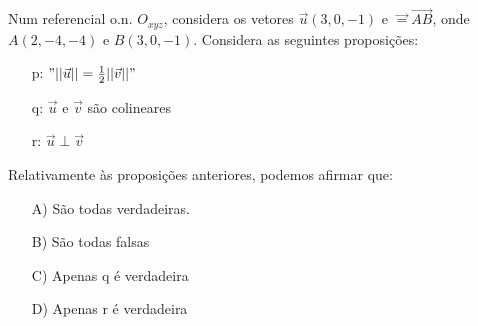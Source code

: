 Num referencial o.n. $O_{xyz}$, considera os vetores $\vec u (3,0,-1)$ e $\vec = \overrightarrow{AB}$, onde $A(2,-4,-4)$ e $B(3,0,-1)$.  Considera as seguintes proposições:
\begin{enumerate}
\item [p:] $"|| \vec u || = \frac 1 2 ||\vec v ||"$
\item [q:] $ \vec u$ e $\vec v$ são colineares 
\item [r:] $ \vec u \perp \vec v$
\end{enumerate}
Relativamente às proposições anteriores, podemos afirmar que:
\begin{enumerate}
\item [A)] São todas verdadeiras.
\item [B)] São todas falsas
\item [C)] Apenas q é verdadeira
\item [D)] Apenas r é verdadeira
\end{enumerate}